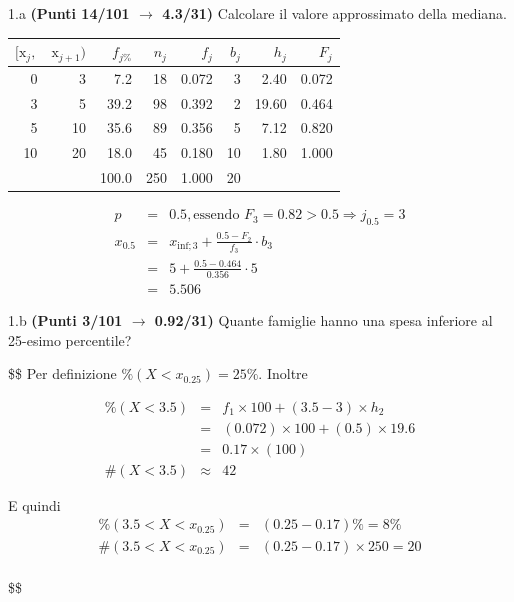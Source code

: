 \documentclass[
  11pt,
]{book}
\theoremstyle{mytheoremstyle}
\theoremstyle{mydefstyle}
\newenvironment{sol}
  {
  \begin{tcolorbox}[enhanced,breakable,arc=0.1mm,boxrule=1pt,colback=white,colframe=iblue,
  title=\bf \fontfamily{lmss}\selectfont \hspace{.5 cm} Soluzione,drop fuzzy shadow]

}{
\end{tcolorbox}
  }
\begin{document}
1.a \textbf{(Punti 14/101 \(\rightarrow\) 4.3/31)} Calcolare il valore approssimato della mediana.

\begin{sol}

\begin{table}[H]
\centering
\begin{tabular}{rrrrrrrr}
\toprule
$[\text{x}_j,$ & $\text{x}_{j+1})$ & $f_{j\%}$ & $n_j$ & $f_j$ & $b_j$ & $h_j$ & $F_j$\\
\midrule
0 & 3 & 7.2 & 18 & 0.072 & 3 & 2.40 & 0.072\\
3 & 5 & 39.2 & 98 & 0.392 & 2 & 19.60 & 0.464\\
5 & 10 & 35.6 & 89 & 0.356 & 5 & 7.12 & 0.820\\
10 & 20 & 18.0 & 45 & 0.180 & 10 & 1.80 & 1.000\\
 &  & 100.0 & 250 & 1.000 & 20 &  & \\
\bottomrule
\end{tabular}
\end{table}

\begin{eqnarray*}
  p &=&  0.5 , \text{essendo }F_{ 3 }= 0.82  > 0.5  \Rightarrow j_{ 0.5 }= 3 \\
  x_{ 0.5 } &=& x_{\text{inf}; 3 } + \frac{ { 0.5 } - F_{ 2 }} {f_{ 3 }} \cdot b_{ 3 } \\
            &=&  5  + \frac {{ 0.5 } -  0.464 } { 0.356 } \cdot  5  \\
            &=&  5.506 
\end{eqnarray*}

\end{sol}

1.b \textbf{(Punti 3/101 \(\rightarrow\) 0.92/31)} Quante famiglie hanno una spesa inferiore al 25-esimo percentile?

\begin{sol}
\$\$
Per definizione \(\%(X<x_{ 0.25 })= 25 \%\). Inoltre

\begin{eqnarray*}
   \%(X< 3.5 ) &=&  f_{ 1 }\times 100 +( 3.5 - 3 )\times h_{ 2 } \\
                &=&  ( 0.072 )\times 100 +( 0.5 )\times  19.6  \\
                &=&  0.17 \times(100) \\
\#(X< 3.5 )    &\approx& 42 
\end{eqnarray*}

E quindi
\begin{eqnarray*}
   \%( 3.5 < X < x_{0.25} ) &=& ( 0.25 - 0.17 )\%= 8 \% \\
   \#( 3.5 < X < x_{0.25} ) &=& ( 0.25 - 0.17 )\times  250 = 20  \\
\end{eqnarray*}

\$\$

\end{sol}
\end{document}
